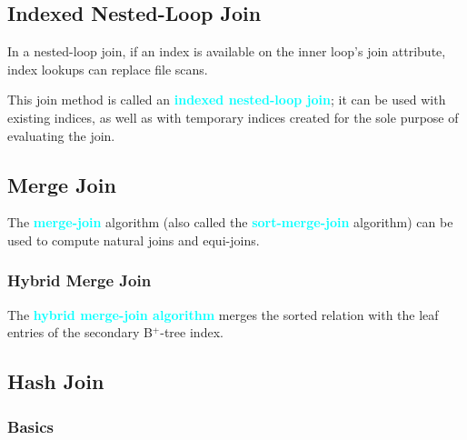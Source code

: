 \documentclass[a4paper,12pt,twoside,openany]{book}
\newcommand{\textcy}[1]{\textbf{\textcolor{cyan}{#1}}}
\begin{document}
\subsection{Indexed Nested-Loop Join}

In a nested-loop join, if an index is available on the inner loop’s join attribute, index lookups can replace file scans.

This join method is called an \textcy{indexed nested-loop join}; it can be used with existing indices, as well as with temporary indices created for the sole purpose of evaluating the join.

\subsection{Merge Join}

The \textcy{merge-join} algorithm (also called the \textcy{sort-merge-join} algorithm) can be used to compute natural joins and equi-joins.

\subsubsection{Hybrid Merge Join}

The \textcy{hybrid merge-join algorithm} merges the sorted relation with the leaf entries of the secondary B$^+$-tree index.

\subsection{Hash Join}
\subsubsection{Basics}
\end{document}
